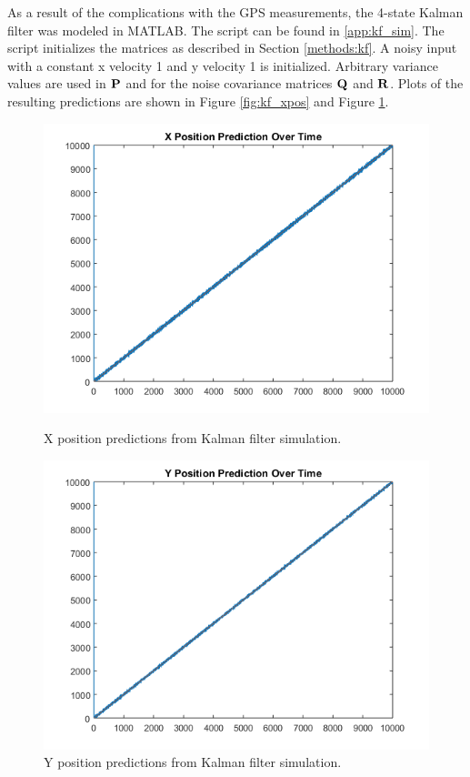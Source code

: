 As a result of the complications with the GPS measurements, the 4-state Kalman filter
was modeled in MATLAB. The script can be found in \ref{app:kf_sim}. The script 
initializes the matrices as described in Section \ref{methods:kf}. A noisy input
with a constant x velocity 1 and y velocity 1 is initialized. Arbitrary variance
values are used in $\mathbf{P}$ and for the noise covariance matrices $\mathbf{Q}$
and $\mathbf{R}$. Plots of the resulting predictions are shown in Figure \ref{fig:kf_xpos} and Figure \ref{fig:kf_ypos}. 
\begin{figure}[ht!]
\begin{minipage}{.5\textwidth}
  \centering
\includegraphics[scale=0.5]{img/kf_xpos.png}
\caption{X position predictions from Kalman filter simulation.}
\label{fig:kf_xpos}
\end{minipage}
\begin{minipage}{0.5\textwidth}
\centering
\includegraphics[scale=0.5]{img/kf_ypos.png}
\caption{Y position predictions from Kalman filter simulation.}
\label{fig:kf_ypos}
\end{minipage}
\end{figure}
